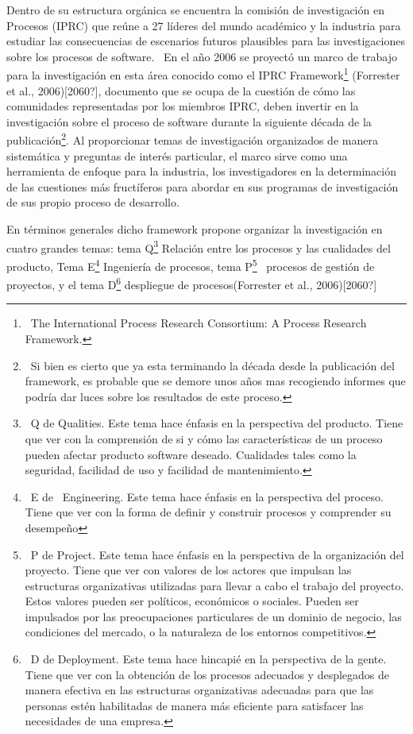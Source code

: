 Dentro de su estructura orgánica se encuentra la comisión de investigación en Procesos (IPRC) que reúne a 27 líderes del mundo académico y la industria para estudiar las consecuencias de escenarios futuros plausibles para las investigaciones sobre los procesos de software. \ En el año 2006 se proyectó un marco de trabajo para la investigación en esta área conocido como el IPRC Framework\footnote{\ The International Process Research Consortium: A Process Research Framework.} (Forrester et al., 2006)[2060?], documento que se ocupa de la cuestión de cómo las comunidades representadas por los miembros IPRC, deben invertir en la investigación sobre el proceso de software durante la siguiente década de la publicación\footnote{\ Si bien es cierto que ya esta terminando la década desde la publicación del framework, es probable que se demore unos años mas recogiendo informes que podría dar luces sobre los resultados de este proceso.}. Al proporcionar temas de investigación organizados de manera sistemática y preguntas de interés particular, el marco sirve como una herramienta de enfoque para la industria, los investigadores en la determinación de las cuestiones más fructíferos para abordar en sus programas de investigación de sus propio proceso de desarrollo. 

En términos generales dicho framework propone organizar la investigación en cuatro grandes temas: tema Q\footnote{\ Q de Qualities. Este tema hace énfasis en la perspectiva del producto. Tiene que ver con la comprensión de si y cómo las características de un proceso pueden afectar producto software deseado. Cualidades tales como la seguridad, facilidad de uso y facilidad de mantenimiento.} Relación entre los procesos y las cualidades del producto, Tema E\footnote{\ E de \ Engineering. Este tema hace énfasis en la perspectiva del proceso. Tiene que ver con la forma de definir y construir procesos y comprender su desempeño } Ingeniería de procesos, tema P\footnote{\ P de Project. Este tema hace énfasis en la perspectiva de la organización del proyecto. Tiene que ver con valores de los actores que impulsan las estructuras organizativas utilizadas para llevar a cabo el trabajo del proyecto. Estos valores pueden ser políticos, económicos o sociales. Pueden ser impulsados por las preocupaciones particulares de un dominio de negocio, las condiciones del mercado, o la naturaleza de los entornos competitivos.} \ procesos de gestión de proyectos, y el tema D\footnote{\ D de Deployment. Este tema hace hincapié en la perspectiva de la gente. Tiene que ver con la obtención de los procesos adecuados y desplegados de manera efectiva en las estructuras organizativas adecuadas para que las personas estén habilitadas de manera más eficiente para satisfacer las necesidades de una empresa.} despliegue de procesos(Forrester et al., 2006)[2060?]


